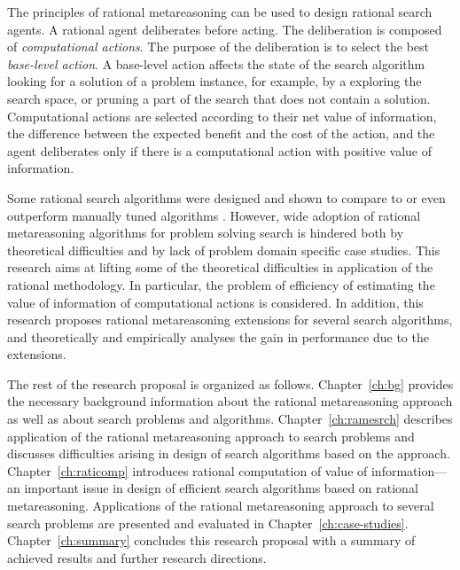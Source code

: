 The principles of rational metareasoning \cite{Russell.right} can be
used to design rational search agents. A rational agent deliberates
before acting. The deliberation is composed of {\em computational
  actions}. The purpose of the deliberation is to select the best {\em
  base-level action}. A base-level action affects the state of the
search algorithm looking for a solution of a problem instance, for
example, by a exploring the search space, or pruning a part of the
search that does not contain a solution. Computational actions are
selected according to their net value of information, the difference
between the expected benefit and the cost of the action, and the agent
deliberates only if there is a computational action with positive
value of information.

Some rational search algorithms were designed and shown to compare to
or even outperform manually tuned algorithms
\cite{Russell.right}. However, wide adoption of rational metareasoning
algorithms for problem solving search is hindered both by theoretical
difficulties and by lack of problem domain specific case studies. This
research aims at lifting some of the theoretical difficulties in
application of the rational methodology. In particular, the problem of
efficiency of estimating the value of information of computational
actions is considered. In addition, this research proposes rational
metareasoning extensions for several search algorithms, and
theoretically and empirically analyses the gain in performance due to
the extensions.

The rest of the research proposal is organized as
follows. Chapter~\ref{ch:bg} provides the necessary background
information about the rational metareasoning approach as well as about
search problems and algorithms. Chapter~\ref{ch:ramesrch}
describes application of the rational metareasoning approach to 
search problems and discusses difficulties arising in design of
search algorithms based on the approach. Chapter~\ref{ch:raticomp} introduces 
rational computation of value of information---an important issue in
design of efficient search algorithms based on rational
metareasoning. Applications of the rational metareasoning approach to
several search problems are presented and evaluated in
Chapter~\ref{ch:case-studies}. Chapter~\ref{ch:summary} concludes this
research proposal with a summary of achieved results and further
research directions.
